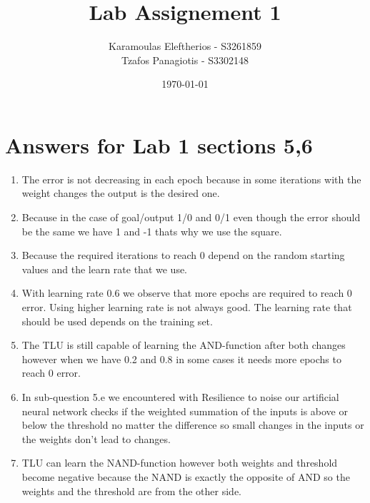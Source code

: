 \documentclass{article}
\title{Lab Assignement 1}
\date{\today}
\author{
	Karamoulas Eleftherios - S3261859\\
	Tzafos Panagiotis - S3302148\\
}
\begin{document}
\maketitle
\section{Answers for Lab 1 sections 5,6}
\begin{enumerate}[{5.a}]
  \item The error is not decreasing in each epoch because in some iterations with the weight changes the output is the desired one.
  \item Because in the case of goal/output 1/0 and 0/1 even though the error should be the same we have 1 and -1 thats why we use the square.
  \item Because the required iterations to reach 0 depend on the random starting values and the learn rate that we use.
  \item With learning rate 0.6 we observe that more epochs are required to reach 0 error. Using higher learning rate is not always good. The learning rate that should be used depends on the training set.
  \item The TLU is still capable of learning the AND-function after both changes however when we have 0.2 and 0.8 in some cases it needs more epochs to reach 0 error.
  \item In sub-question 5.e we encountered with Resilience to noise our artificial neural network checks if the weighted summation of the inputs is above or below the threshold no matter the difference so small changes in the inputs or the weights don't lead to changes.
  \item TLU can learn the NAND-function however both weights and threshold become negative because the NAND is exactly the opposite of AND so the weights and the threshold are from the other side.

\end{enumerate}
\end{document}
